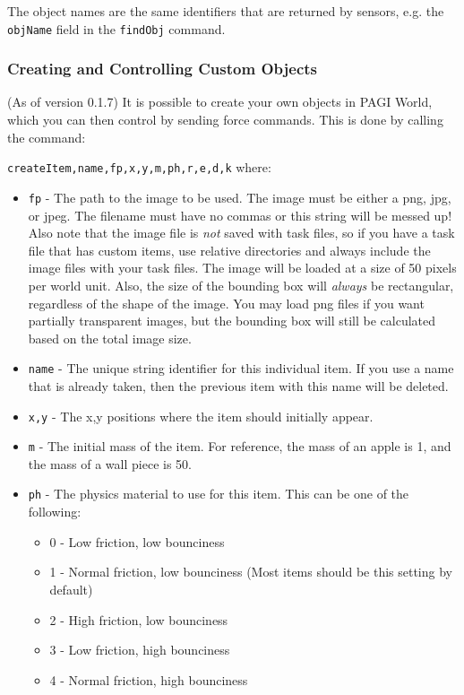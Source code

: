 The object names are the same identifiers that are returned by sensors, e.g. the \texttt{objName} field in the \texttt{findObj} command.

\subsubsection{Creating and Controlling Custom Objects}

(As of version 0.1.7) It is possible to create your own objects in PAGI World, which you can then control by sending force commands. This is done by calling the command:

\texttt{createItem,name,fp,x,y,m,ph,r,e,d,k} where:

\begin{itemize}
\item \texttt{fp} - The path to the image to be used. The image must be either a png, jpg, or jpeg. The filename must have no commas or this string will be messed up! Also note that the image file is \textit{not} saved with task files, so if you have a task file that has custom items, use relative directories and always include the image files with your task files. The image will be loaded at a size of 50 pixels per world unit. Also, the size of the bounding box will \textit{always} be rectangular, regardless of the shape of the image. You may load png files if you want partially transparent images, but the bounding box will still be calculated based on the total image size.
\item \texttt{name} - The unique string identifier for this individual item. If you use a name that is already taken, then the previous item with this name will be deleted.
\item \texttt{x,y} - The x,y positions where the item should initially appear.
\item \texttt{m} - The initial mass of the item. For reference, the mass of an apple is 1, and the mass of a wall piece is 50.
\item \texttt{ph} - The physics material to use for this item. This can be one of the following:
	\begin{itemize}
	\item 0 - Low friction, low bounciness
	\item 1 - Normal friction, low bounciness (Most items should be this setting by default)
	\item 2 - High friction, low bounciness
	\item 3 - Low friction, high bounciness
	\item 4 - Normal friction, high bounciness

\end{itemize}
\end{itemize}
